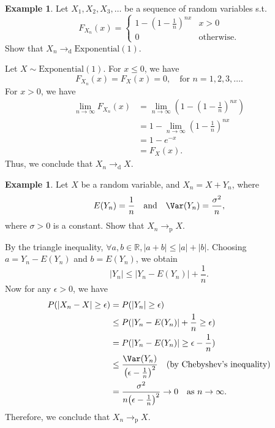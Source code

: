 \documentclass[12pt]{report}
\theoremstyle{definition}
\begin{document}
\newtheorem{convergence in distribution eg}[theorem]{Example}
\begin{convergence in distribution eg}
    Let $X_1,X_2,X_3,\ldots$ be a sequence of random variables s.t.
    \[
        F_{X_n}(x)=
        \begin{cases}
            1-{(1-\frac{1}{n})}^{nx} & x>0 \\
            0 & \text{otherwise}.
        \end{cases} 
    \]
    Show that $X_n\rightarrow_\text{d}\text{Exponential}(1)$.
    
    \medskip
    Let $X\sim\text{Exponential}(1)$. For $x\le 0$, we have
    \[
        F_{X_n}(x)=F_X(x)=0,\quad\text{for }n=1,2,3,\ldots.
    \]
    For $x>0$, we have
    \begin{align*}
        \lim_{n\rightarrow\infty}F_{X_n}(x)
        & =
        \lim_{n\rightarrow\infty}\left(1-{\left(1-\frac{1}{n}\right)}^{nx}\right) \\
        & = 1-\lim_{n\rightarrow\infty}{\left(1-\frac{1}{n}\right)}^{nx} \\
        & = 1-e^{-x} \\
        & = F_X(x).
    \end{align*} 
    Thus, we conclude that $X_n\rightarrow_\text{d}X$.
\end{convergence in distribution eg}

\newtheorem{convergence in probability eg}[theorem]{Example}
\begin{convergence in probability eg}
    Let $X$ be a random variable, and $X_n=X+Y_n$, where
    \[
        E(Y_n)=\frac{1}{n}\quad\text{and}\quad
        \Var(Y_n)=\frac{\sigma^{2}}{n},
    \]
    where $\sigma>0$ is a constant. Show that $X_n\rightarrow_\text{p}X$.

    \medskip
    By the triangle inequality, $\forall a,b\in\mathbb{R}, |a+b|\le|a|+|b|$.
    Choosing $a=Y_n-E(Y_n)$ and $b=E(Y_n)$, we obtain
    \[
        |Y_n|\le |Y_n-E(Y_n)|+\frac{1}{n}.
    \]
    Now for any $\epsilon>0$, we have
    \begin{align*}
        P(|X_n-X|\ge\epsilon)
        & = P(|Y_n|\ge\epsilon) \\
        & \le P(|Y_n-E(Y_n)|+\frac{1}{n}\ge\epsilon) \\
        & = P(|Y_n-E(Y_n)|\ge\epsilon-\frac{1}{n}) \\
        & \le \frac{\Var(Y_n)}{{\left(\epsilon-\frac{1}{n}\right)}^{2}}
        \quad\text{(by Chebyshev's inequality)} \\
        & = \frac{\sigma^{2}}{n{\left(\epsilon-\frac{1}{n}\right)}^{2}}
        \rightarrow 0\quad\text{as }n\rightarrow\infty.
    \end{align*} 
    Therefore, we conclude that $X_n\rightarrow_\text{p}X$.
\end{convergence in probability eg}
\end{document}
